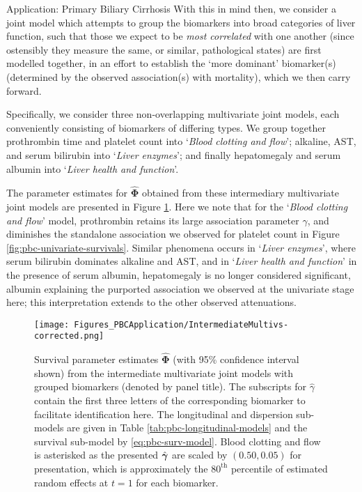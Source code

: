 \begin{chapter}{\label{cha:app-PBC}Application: Primary Biliary Cirrhosis}
  With this in mind then, we consider a joint model which attempts to group the biomarkers into broad categories of liver function, such that those we expect to be \textit{most correlated} with one another (since ostensibly they measure the same, or similar, pathological states) are first modelled together, in an effort to establish the `more dominant' biomarker(s) (determined by the observed association(s) with mortality), which we then carry forward.

  Specifically, we consider three non-overlapping multivariate joint models, each conveniently consisting of biomarkers of differing types. We group together prothrombin time and platelet count into `\textit{Blood clotting and flow}'; alkaline, AST, and serum bilirubin into `\textit{Liver enzymes}'; and finally hepatomegaly and serum albumin into `\textit{Liver health and function}'. 

  The parameter estimates for $\hat{\bm{\Phi}}$ obtained from these intermediary multivariate joint models are presented in Figure \ref{fig:pbc-multivariate-intermediate}. Here we note that for the `\textit{Blood clotting and flow}' model, prothrombin retains its large association parameter $\hat{\gamma}$, and diminishes the standalone association we observed for platelet count in Figure \ref{fig:pbc-univariate-survivals}. Similar phenomena occurs in `\textit{Liver enzymes}', where serum bilirubin dominates alkaline and AST, and in `\textit{Liver health and function}' in the presence of serum albumin, hepatomegaly is no longer considered significant, albumin explaining the purported association we observed at the univariate stage here; this interpretation extends to the other observed attenuations.

  \begin{figure}[ht]
      \centering
      \texttt{[image: Figures\_PBCApplication/IntermediateMultivs-corrected.png]}
      \caption{Survival parameter estimates $\hat{\bm{\Phi}}$ (with 95\% confidence interval shown) from the intermediate multivariate joint models with grouped biomarkers (denoted by panel title). The subscripts for $\hat{\gamma}$ contain the first three letters of the corresponding biomarker to facilitate identification here. The longitudinal and dispersion sub-models are given in Table \ref{tab:pbc-longitudinal-models} and the survival sub-model by \eqref{eq:pbc-surv-model}. Blood clotting and flow is asterisked as the presented $\hat{\bm{\gamma}}$ are scaled by $(0.50, 0.05)$ for presentation, which is approximately the $80^{\mathrm{th}}$ percentile of estimated random effects at $t=1$ for each biomarker.}
      \label{fig:pbc-multivariate-intermediate}
  \end{figure}


\end{chapter}
